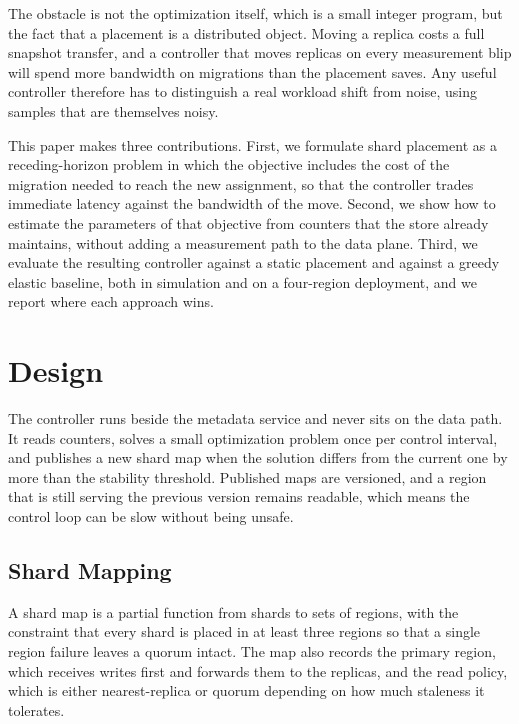﻿\documentclass[10pt,twocolumn,letterpaper]{article}
\begin{document}
The obstacle is not the optimization itself, which is a small integer program, but the
fact that a placement is a distributed object. Moving a replica costs a full snapshot
transfer, and a controller that moves replicas on every measurement blip will spend more
bandwidth on migrations than the placement saves. Any useful controller therefore has to
distinguish a real workload shift from noise, using samples that are themselves noisy.

This paper makes three contributions. First, we formulate shard placement as a
receding-horizon problem in which the objective includes the cost of the migration needed
to reach the new assignment, so that the controller trades immediate latency against the
bandwidth of the move. Second, we show how to estimate the parameters of that objective
from counters that the store already maintains, without adding a measurement path to the
data plane. Third, we evaluate the resulting controller against a static placement and
against a greedy elastic baseline, both in simulation and on a four-region deployment,
and we report where each approach wins.

\section{Design}
The controller runs beside the metadata service and never sits on the data path. It
reads counters, solves a small optimization problem once per control interval, and
publishes a new shard map when the solution differs from the current one by more than
the stability threshold. Published maps are versioned, and a region that is still
serving the previous version remains readable, which means the control loop can be slow
without being unsafe.

\subsection{Shard Mapping}
A shard map is a partial function from shards to sets of regions, with the constraint
that every shard is placed in at least three regions so that a single region failure
leaves a quorum intact. The map also records the primary region, which receives writes
first and forwards them to the replicas, and the read policy, which is either
nearest-replica or quorum depending on how much staleness it tolerates.
\end{document}
